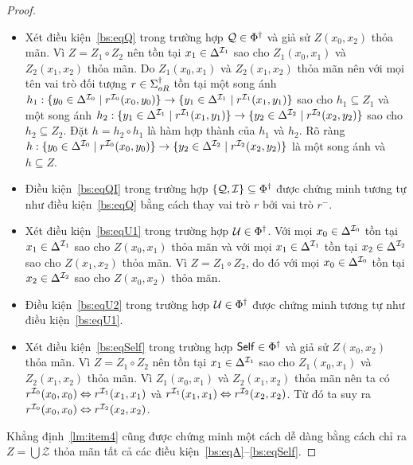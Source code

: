 \begin{proof}
\begin{itemize}
		\item Xét điều kiện~\eqref{bs:eqQ} trong trường hợp $\mathcal{Q} \in \Phi^\dag$ và giả sử $Z(x_0, x_2)$ thỏa mãn. Vì $Z = Z_1 \circ Z_2$ nên tồn tại $x_1 \in \Delta^{\mathcal{I}_1}$ sao cho  $Z_1(x_0,x_1)$ và $Z_2(x_1, x_2)$ thỏa mãn. Do $Z_1(x_0,x_1)$ và $Z_2(x_1, x_2)$ thỏa mãn nên với mọi tên vai trò đối tượng $r \in \Sigma^\dag_{oR}$ tồn tại một song ánh $h_1 : \{y_0 \in \Delta^{\mathcal{I}_0} \mid r^{\mathcal{I}_0}(x_0,y_0)\} \rightarrow \{y_1 \in \Delta^{\mathcal{I}_1} \mid r^{\mathcal{I}_1}(x_1,y_1)\}$ sao cho $h_1 \subseteq Z_1$  và một song ánh $h_2 : \{y_1 \in \Delta^{\mathcal{I}_1} \mid r^{\mathcal{I}_1}(x_1,y_1)\} \rightarrow \{y_2 \in \Delta^{\mathcal{I}_2} \mid r^{\mathcal{I}_2}(x_2,y_2)\}$ sao cho $h_2 \subseteq Z_2$. 
		Đặt $h = h_2 \circ h_1$ là hàm hợp thành của $h_1$ và $h_2$. Rõ ràng $h : \{y_0 \in \Delta^{\mathcal{I}_0} \mid r^{\mathcal{I}_0}(x_0,y_0)\} \rightarrow \{y_2 \in \Delta^{\mathcal{I}_2} \mid r^{\mathcal{I}_2}(x_2,y_2)\}$ là một song ánh và $h \subseteq Z$.
		
		\item Điều kiện~\eqref{bs:eqQI} trong trường hợp $\{\mathcal{Q}, \mathcal{I}\} \subseteq \Phi^\dag$ được chứng minh tương tự như điều kiện~\eqref{bs:eqQ} bằng cách thay vai trò $r$ bởi vai trò $r^-$.
		
		\item Xét điều kiện~\eqref{bs:eqU1} trong trường hợp $\mathcal{U} \in \Phi^\dag$. Với mọi $x_0 \in \Delta^{\mathcal{I}_0}$ tồn tại $x_1 \in \Delta^{\mathcal{I}_1}$ sao cho $Z(x_0,x_1)$ thỏa mãn và với mọi $x_1 \in \Delta^{\mathcal{I}_1}$ tồn tại $x_2 \in \Delta^{\mathcal{I}_2}$ sao cho $Z(x_1,x_2)$ thỏa mãn. Vì $Z=Z_1 \circ Z_2$, do đó với mọi $x_0 \in \Delta^{\mathcal{I}_0}$ tồn tại $x_2 \in \Delta^{\mathcal{I}_2}$ sao cho $Z(x_0,x_2)$ thỏa mãn.
		
		\item Điều kiện~\eqref{bs:eqU2} trong trường hợp $\mathcal{U} \in \Phi^\dag$ được chứng minh tương tự như điều kiện~\eqref{bs:eqU1}.
		
		\item Xét điều kiện~\eqref{bs:eqSelf} trong trường hợp $\mathsf{Self} \in \Phi^\dag$ và giả sử $Z(x_0,x_2)$ thỏa mãn. Vì $Z = Z_1 \circ Z_2$ nên tồn tại $x_1 \in \Delta^{\mathcal{I}_1}$ sao cho $Z_1(x_0,x_1)$ và $Z_2(x_1, x_2)$ thỏa mãn. Vì $Z_1(x_0,x_1)$ và $Z_2(x_1, x_2)$ thỏa mãn nên ta có $r^{\mathcal{I}_0}(x_0,x_0) \Leftrightarrow r^{\mathcal{I}_1}(x_1,x_1)$ và $r^{\mathcal{I}_1}(x_1,x_1) \Leftrightarrow r^{\mathcal{I}_2}(x_2,x_2)$. Từ đó ta suy ra $r^{\mathcal{I}_0}(x_0,x_0) \Leftrightarrow r^{\mathcal{I}_2}(x_2,x_2)$.
	\end{itemize}
	\semiItem Khẳng định~\eqref{lm:item4} cũng được chứng minh một cách dễ dàng bằng cách chỉ ra $Z = \bigcup \mathcal{Z}$ thỏa mãn tất cả các điều kiện~\eqref{bs:eqA}--\eqref{bs:eqSelf}.
\end{proof}

